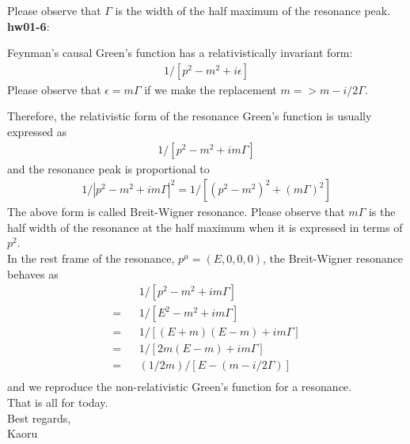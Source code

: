   Please observe that $\Gamma$ is the width of the
  half maximum of the resonance peak.\\

{\bf hw01-6}:

  Feynman's causal Green's function has a relativistically
  invariant form:
  \begin{eqnarray}
  1/[ p^2 - m^2 + i\epsilon ]
  \end{eqnarray}
  Please observe that $\epsilon = m\Gamma$ if we make the
  replacement
  $m => m - i/2 \Gamma$.

  Therefore, the relativistic form of the resonance
  Green's function is usually expressed as
  \begin{eqnarray}
  1/[ p^2 - m^2 + im\Gamma ]
  \end{eqnarray}
  and the resonance peak is proportional to
  \begin{eqnarray}
    1/| p^2 - m^2 + im\Gamma |^2
  = 1/[ (p^2 - m^2)^2 + (m\Gamma)^2 ]
  \end{eqnarray}
  The above form is called Breit-Wigner resonance.
  Please observe that $m\Gamma$ is the half width of the
  resonance at the half maximum when it is expressed
  in terms of $p^2$.\\

  In the rest frame of the resonance, $p^\mu = (E,0,0,0)$,
  the Breit-Wigner resonance behaves as
  \begin{eqnarray}
    &&1/[ p^2 - m^2 + im\Gamma ] \\
  =&& 1/[ E^2 - m^2 + im\Gamma ] \\
  =&& 1/[ (E + m)(E-m) + im\Gamma ] \\
  =&& 1/[ 2m (E-m) + im\Gamma ] \\
  = &&(1/2m)/[ E - (m - i/2 \Gamma) ]\\
  \end{eqnarray}
  and we reproduce the non-relativistic Green's function
  for a resonance.\\

That is all for today.\\

Best regards,\\

Kaoru



